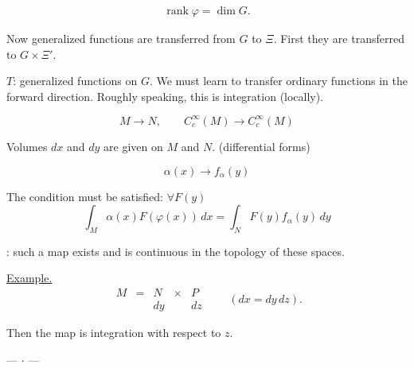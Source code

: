 \begin{gather*}
\operatorname{rank}\varphi=\dim G.
\end{gather*}



Now generalized functions are transferred from $G$ to $\Xi$.
First they are transferred to $G\times\Xi'$.



$T$: generalized functions on $G$.
We must learn to transfer ordinary functions in the forward
direction. Roughly speaking, this is integration (locally).





\begin{equation*}
M\longrightarrow N,\qquad C_c^{\infty}(M)\longrightarrow C_c^{\infty}(M)
\end{equation*}



Volumes $dx$ and $dy$ are given on $M$ and $N$. (differential forms)



\begin{equation*}\alpha (x)\longrightarrow f_{\alpha}(y)\end{equation*}



The condition must be satisfied: $\forall F (y)$
\begin{equation*}
\int_M\alpha (x)F (\varphi (x))\, dx
=\int_N F (y)f_{\alpha}(y)\, dy
\end{equation*}



: such a map exists and is continuous in the topology of these spaces.



\underline{Example.}
\begin{equation*}
\begin{array}{ccccc}M&=&N&\times&P\\&&dy&&dz\end{array}
\qquad (dx=dy\, dz).
\end{equation*}



Then the map is integration with respect to $z$.



\begin{center}— $\cdot$ —\end{center}



